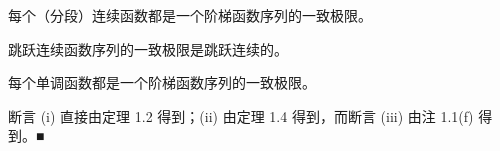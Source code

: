\begin{corollary}

\begin{subitems}
\item

每个（分段）连续函数都是一个阶梯函数序列的一致极限。

\item

跳跃连续函数序列的一致极限是跳跃连续的。

\item

每个单调函数都是一个阶梯函数序列的一致极限。

\proofhead
断言 (i) 直接由定理 1.2 得到；(ii) 由定理 1.4 得到，而断言 (iii) 由注 1.1(f) 得到。\nobreak\hspace{0.35em}■
\end{subitems}

\end{corollary}

\exerciseshead

